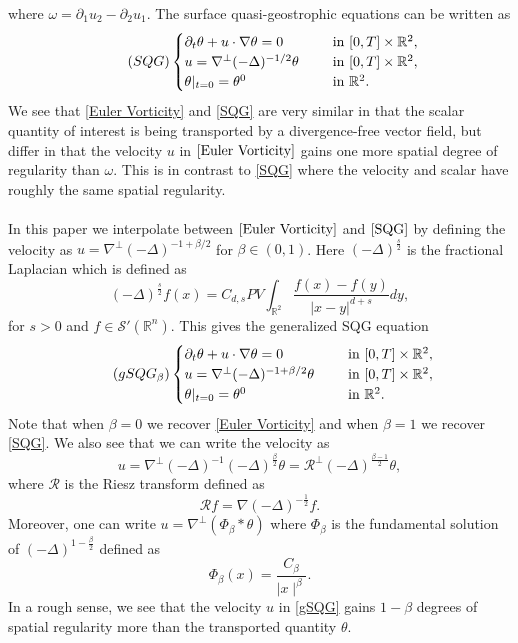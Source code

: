 \documentclass[12pt,xcolor=svgnames]{amsart}
\newcommand{\R}{\mathbb{R}}
\newcommand{\abs}[1]{\mid\!#1\!\mid}
\begin{document}
where $\omega = \partial_1u_2-\partial_2u_1$. The surface quasi-geostrophic equations can be written as
\begin{equation}
\label{SQG}
\tag{$SQG$}
\begin{cases}
\partial_t \theta + u \cdot \nabla \theta = 0 \hspace{.5cm} &\text{in } [0,T]\times \R^2, \\
u=\nabla^{\perp}(-\Delta)^{-1/2} \theta \hspace{.5cm} &\text{in } [0,T]\times \R^2, \\
\theta\vert_{t=0} = \theta^0 \hspace{.5cm} &\text{in } \R^2.
\end{cases}
\end{equation} 
We see that \eqref{Euler Vorticity} and \eqref{SQG} are very similar in that the scalar quantity of interest is being transported by a divergence-free vector field, but differ in that the velocity $u$ in $\eqref{Euler Vorticity}$ gains one more spatial degree of regularity than $\omega$. This is in contrast to \eqref{SQG} where the velocity and scalar have roughly the same spatial regularity.
\\
\\
In this paper we interpolate between $\eqref{Euler Vorticity}$ and $\eqref{SQG}$ by defining the velocity as $u = \nabla^{\perp}(-\Delta)^{-1+\beta/2}$ for $\beta \in (0,1)$. Here $(-\Delta)^{\frac{s}{2}}$ is the fractional Laplacian which is defined as 
$$
(-\Delta)^{\frac{s}{2}}f(x) = C_{d,s}PV\int_{\R^2}\frac{f(x)-f(y)}{|x-y|^{d+s}}dy,
$$
for $s>0$ and $f \in \mathcal{S}'(\R^n)$. This gives the generalized SQG equation
\begin{equation}
\label{gSQG}
\tag{$gSQG_{\beta}$}
\begin{cases}
\partial_t \theta + u \cdot \nabla \theta = 0 \hspace{.5cm} &\text{in } [0,T]\times \R^2, \\
u=\nabla^{\perp}(-\Delta)^{-1+\beta/2} \theta \hspace{.5cm} &\text{in } [0,T]\times \R^2, \\
\theta\vert_{t=0} = \theta^0 \hspace{.5cm} &\text{in } \R^2.
\end{cases}
\end{equation}
Note that when $\beta=0$ we recover \eqref{Euler Vorticity} and when $\beta=1$ we recover \eqref{SQG}. We also see that we can write the velocity as
$$
u=\nabla^{\perp} (-\Delta)^{-1}(-\Delta)^{\frac{\beta}{2}}\theta = \mathcal{R}^{\perp}(-\Delta)^{\frac{\beta-1}{2}}\theta,
$$
where $\mathcal{R}$ is the Riesz transform defined as $$\mathcal{R}f = \nabla (-\Delta)^{-\frac{1}{2}} f.$$
Moreover, one can write $u=\nabla^{\perp}(\Phi_{\beta}\ast \theta)$ where $\Phi_{\beta}$ is the fundamental solution of $(-\Delta)^{1-\frac{\beta}{2}}$ defined as 
$$
\Phi_{\beta}(x)=\frac{C_{\beta}}{\abs{x}^{\beta}}.
$$ In a rough sense, we see that the velocity $u$ in \eqref{gSQG} gains $1-\beta$ degrees of spatial regularity more than the transported quantity $\theta$.
\end{document}
